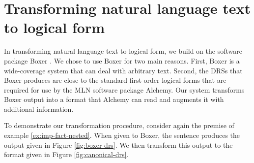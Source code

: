 \section{Transforming natural language text to logical form}

In transforming natural language text to logical form, we build on the software
package Boxer \citep{bos:coling2004}. %
%
We chose to use Boxer for two main reasons.  First, Boxer is a
wide-coverage system that can deal with arbitrary text. 
Second, the DRSs that Boxer produces are close to the standard first-order
logical forms that are required for use by the MLN software package 
Alchemy.  Our system transforms Boxer output into a format that Alchemy can read and 
augments it with additional information.

To demonstrate our transformation procedure, consider again the premise of
example \eqref{ex:imp-fact-nested}.  When given to Boxer, the sentence produces
the output given in Figure \ref{fig:boxer-drs}.  We then transform this output
to the format given in Figure \ref{fig:canonical-drs}.


